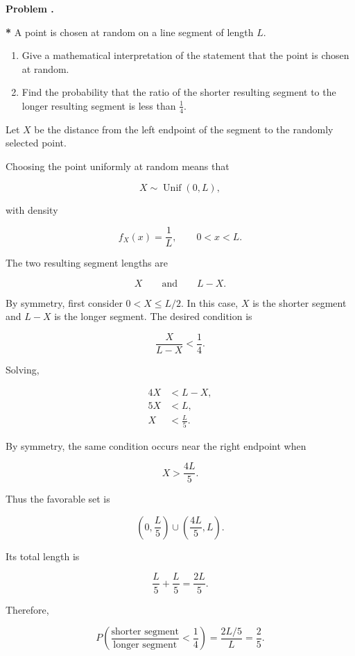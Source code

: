 \documentclass[11pt]{article}
\newcounter{problem}
\newenvironment{problem}[1][]{
    \refstepcounter{problem}
    \begin{problemheader}
        \textbf{Problem \theproblem%
        \if\relax\detokenize{#1}\relax
        \else. #1%
        \fi}
    \end{problemheader}
}{
    \vspace{0.5em}
}
\newenvironment{solution}{
    \par
    \begin{tcolorbox}[
        colback=white,
        colframe=uwgold,
        boxrule=0.7pt,
        arc=2mm,
        left=3mm,
        right=3mm,
        top=2mm,
        bottom=2mm,
        breakable,
        before skip=0.5em,
        after skip=1em,
        title=\textbf{Solution},
        coltitle=uwpurple,
        fonttitle=\bfseries
    ]
}{
    \end{tcolorbox}
}
\begin{document}
   \newpage \begin{problem} 

\textbf{ *} A point is chosen at random on a line segment of length \(L\).

\begin{enumerate}[label=(\alph*)]
    \item Give a mathematical interpretation of the statement that the
    point is chosen at random.
    \item Find the probability that the ratio of the shorter resulting
    segment to the longer resulting segment is less than \(\frac14\).
\end{enumerate}
\end{problem}
\begin{solution}

Let \(X\) be the distance from the left endpoint of the segment to the
randomly selected point.

Choosing the point uniformly at random means that

\[
X\sim\operatorname{Unif}(0,L),
\]

with density

\[
f_X(x)=\frac1L,
\qquad 0<x<L.
\]

The two resulting segment lengths are

\[
X
\qquad\text{and}\qquad
L-X.
\]

By symmetry, first consider \(0<X\leq L/2\). In this case, \(X\) is the
shorter segment and \(L-X\) is the longer segment. The desired condition is

\[
\frac{X}{L-X}<\frac14.
\]

Solving,

\begin{align*}
4X&<L-X,\\
5X&<L,\\
X&<\frac{L}{5}.
\end{align*}

By symmetry, the same condition occurs near the right endpoint when

\[
X>\frac{4L}{5}.
\]

Thus the favorable set is

\[
\left(0,\frac{L}{5}\right)
\cup
\left(\frac{4L}{5},L\right).
\]

Its total length is

\[
\frac{L}{5}+\frac{L}{5}
=
\frac{2L}{5}.
\]

Therefore,

\[
P\left(
\frac{\text{shorter segment}}{\text{longer segment}}<\frac14
\right)
=
\frac{2L/5}{L}
=
 {\frac25}.
\]

\end{solution}
 
\end{document}
